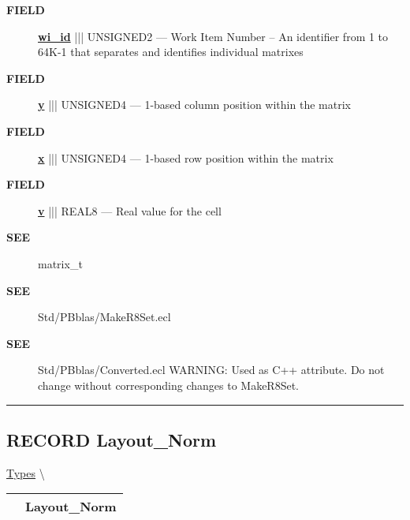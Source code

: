 \par
\begin{description}
\item [\colorbox{tagtype}{\color{white} \textbf{\textsf{FIELD}}}] \textbf{\underline{wi\_id}} ||| UNSIGNED2 --- Work Item Number -- An identifier from 1 to 64K-1 that separates and identifies individual matrixes
\item [\colorbox{tagtype}{\color{white} \textbf{\textsf{FIELD}}}] \textbf{\underline{y}} ||| UNSIGNED4 --- 1-based column position within the matrix
\item [\colorbox{tagtype}{\color{white} \textbf{\textsf{FIELD}}}] \textbf{\underline{x}} ||| UNSIGNED4 --- 1-based row position within the matrix
\item [\colorbox{tagtype}{\color{white} \textbf{\textsf{FIELD}}}] \textbf{\underline{v}} ||| REAL8 --- Real value for the cell
\end{description}







\par
\begin{description}
\item [\colorbox{tagtype}{\color{white} \textbf{\textsf{SEE}}}] matrix\_t
\item [\colorbox{tagtype}{\color{white} \textbf{\textsf{SEE}}}] Std/PBblas/MakeR8Set.ecl
\item [\colorbox{tagtype}{\color{white} \textbf{\textsf{SEE}}}] Std/PBblas/Converted.ecl WARNING: Used as C++ attribute. Do not change without corresponding changes to MakeR8Set.
\end{description}




\rule{\linewidth}{0.5pt}
\subsection*{\textsf{\colorbox{headtoc}{\color{white} RECORD}
Layout\_Norm}}

\hypertarget{ecldoc:pbblas.types.layout_norm}{}
\hspace{0pt} \hyperlink{ecldoc:PBblas.Types}{Types} \textbackslash 

{\renewcommand{\arraystretch}{1.5}
\begin{tabularx}{\textwidth}{|>{\raggedright\arraybackslash}l|X|}
\hline
\hspace{0pt}\mytexttt{\color{red} } & \textbf{Layout\_Norm} \\
\hline
\end{tabularx}
}

